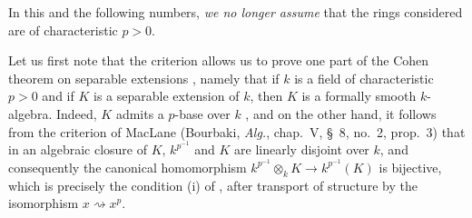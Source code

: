 In this and the following numbers, \emph{we no longer assume} that the rings considered are of characteristic $p>0$.

\begin{env}[21.5.1]
\label{0.21.5.1}
Let us first note that the criterion  allows us to prove one part of the Cohen theorem on separable extensions , namely that if $k$ is a field of characteristic $p>0$ and if $K$ is a separable extension of $k$, then $K$ is a formally smooth $k$-algebra.
Indeed, $K$ admits a $p$-base over $k$ , and on the other hand, it follows from the criterion of MacLane (Bourbaki, \emph{Alg.}, chap.~V, \S~8, no.~2, prop.~3) that in an algebraic closure of $K$, $k^{p^{-1}}$ and $K$ are linearly disjoint over $k$, and consequently the canonical homomorphism $k^{p^{-1}}\otimes_k K\to k^{p^{-1}}(K)$ is bijective, which is precisely the condition (i) of , after transport of structure by the isomorphism $x\rightsquigarrow x^p$.
\end{env}

